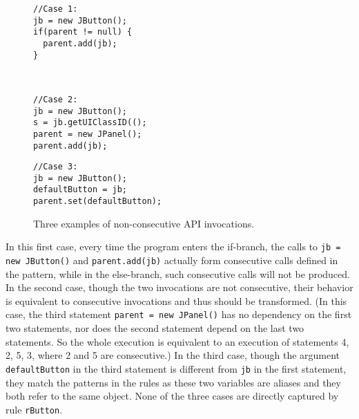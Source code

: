 \documentclass[letterpaper, USenglish]{lipics-v2016}
\newenvironment{smpage}[1]
{\begin{lrbox}{\fmbox}\begin{minipage}{#1}}
{\end{minipage}\end{lrbox}\usebox{\fmbox}}
\newcommand{\code}[1]{\texttt{\footnotesize #1}}
\theoremstyle{plain}
\begin{document}
\begin{figure}
\begin{center}
\begin{smpage}{0.3\columnwidth}
\begin{lstlisting}[style=java,frame=none, basicstyle=\scriptsize\ttfamily]
//Case 1:
jb = new JButton();
if(parent != null) {
  parent.add(jb);
}
\end{lstlisting}
\end{smpage}
~~
\begin{smpage}{0.3\columnwidth}
\begin{lstlisting}[style=java,frame=none, basicstyle=\scriptsize\ttfamily]
//Case 2:
jb = new JButton();
s = jb.getUIClassID(();
parent = new JPanel();
parent.add(jb);
\end{lstlisting}
\end{smpage}
\begin{smpage}{0.3\columnwidth}
\begin{lstlisting}[style=java,frame=none, basicstyle=\scriptsize\ttfamily]
//Case 3:
jb = new JButton();
defaultButton = jb;
parent.set(defaultButton);
\end{lstlisting}
\end{smpage}
\end{center}
\vspace{-15pt}
\caption{Three examples of non-consecutive API invocations.}
\label{eg:intro:3cases}
\vspace{-12pt}
\end{figure}

In this first case, every time the program enters the if-branch,
the calls to \code{jb = new JButton()} and \code{parent.add(jb)}
actually form consecutive calls defined in the pattern, while in the
else-branch, such consecutive calls will not be produced. In the second case, 
though the two invocations are not consecutive, their behavior is
equivalent to consecutive invocations and thus should be transformed. (In this case, the third statement \code{parent = new JPanel()} has no dependency on the first two statements, nor does the second statement
depend on the last two statements. So the whole execution is
equivalent to an execution of statements 4, 2, 5, 3, where 2 and 5 are
consecutive.)
 In the third case, though the argument
\code{defaultButton} in the third statement is different from
\code{jb} in the first statement, they match the
patterns in the rules as these two variables are aliases and they both
refer to the same object. None of the three cases are directly captured by
rule \code{rButton}.
\end{document}
